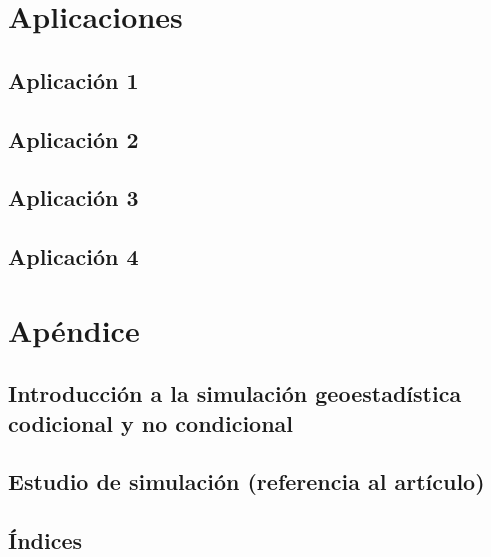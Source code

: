 \documentclass[
]{book}
\begin{document}
\hypertarget{aplicaciones}{%
\chapter{Aplicaciones}\label{aplicaciones}}

\hypertarget{aplicaciuxf3n-1}{%
\section{Aplicación 1}\label{aplicaciuxf3n-1}}

\hypertarget{aplicaciuxf3n-2}{%
\section{Aplicación 2}\label{aplicaciuxf3n-2}}

\hypertarget{aplicaciuxf3n-3}{%
\section{Aplicación 3}\label{aplicaciuxf3n-3}}

\hypertarget{aplicaciuxf3n-4}{%
\section{Aplicación 4}\label{aplicaciuxf3n-4}}

\hypertarget{apuxe9ndice}{%
\chapter{Apéndice}\label{apuxe9ndice}}

\hypertarget{introducciuxf3n-a-la-simulaciuxf3n-geoestaduxedstica-codicional-y-no-condicional}{%
\section{Introducción a la simulación geoestadística codicional y no condicional}\label{introducciuxf3n-a-la-simulaciuxf3n-geoestaduxedstica-codicional-y-no-condicional}}

\hypertarget{estudio-de-simulaciuxf3n-referencia-al-artuxedculo}{%
\section{Estudio de simulación (referencia al artículo)}\label{estudio-de-simulaciuxf3n-referencia-al-artuxedculo}}

\hypertarget{uxedndices}{%
\section{Índices}\label{uxedndices}}
\end{document}
